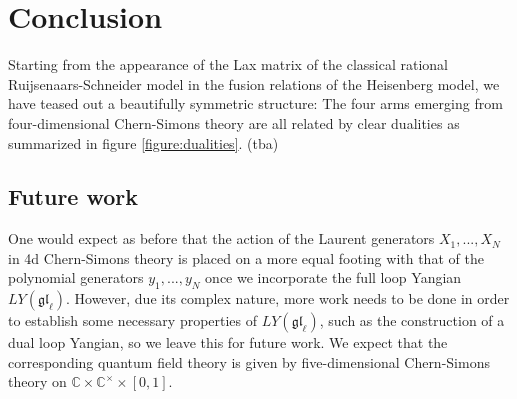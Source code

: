 \documentclass[11pt]{report}
\newtheorem{lemma}[theorem]{Lemma}
\newtheorem{prop}[theorem]{Proposition}
\theoremstyle{definition}
\theoremstyle{remark}
\theoremstyle{remark}
\newcommand{\C}{\mathbb{C}}
\begin{document}
%
%

\chapter{Conclusion}\label{chapter:conclusion}

Starting from the appearance of the Lax matrix of the classical rational Ruijsenaars-Schneider model in the fusion relations of the Heisenberg model, we have teased out a beautifully symmetric structure: The four arms emerging from four-dimensional Chern-Simons theory are all related by clear dualities as summarized in figure \ref{figure:dualities}. (tba)

\section*{Future work}

One would expect as before that the action of the Laurent generators $X_1,...,X_N$ in 4d Chern-Simons theory is placed on a more equal footing with that of the polynomial generators $y_1,...,y_N$ once we incorporate the full loop Yangian $LY(\mathfrak{gl}_\ell)$. However, due its complex nature, more work needs to be done in order to establish some necessary properties of $LY(\mathfrak{gl}_\ell)$, such as the construction of a dual loop Yangian, so we leave this for future work. We expect that the corresponding quantum field theory is given by five-dimensional Chern-Simons theory on $\C \times \C^\times \times [0,1]$.
\end{document}

